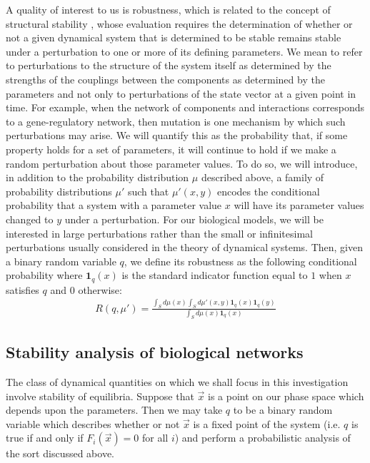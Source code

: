 A quality of interest to us is robustness, which is related to the concept of structural stability \cite{Smale1967}, whose evaluation requires the determination of whether or not a given dynamical system that is determined to be stable remains stable under a perturbation to one or more of its defining parameters. We mean to refer to perturbations to the structure of the system itself as determined by the strengths of the couplings between the components as determined by the parameters and not only to perturbations of the state vector at a given point in time. For example, when the network of components and interactions corresponds to a gene-regulatory network, then mutation is one mechanism by which such perturbations may arise.  We will quantify this as the probability that, if some property holds for a set of parameters, it will continue to hold if we make a random perturbation about those parameter values. To do so, we will introduce, in addition to the probability distribution $\mu$ described above, a family of probability distributions $\mu'$ such that $\mu'(x,y)$ encodes the conditional probability that a system with a parameter value $x$ will have its parameter values changed to $y$ under a perturbation.  For our biological models, we will be interested in large perturbations rather than the small or infinitesimal perturbations usually considered in the theory of dynamical systems.  Then, given a binary random variable $q$, we define its robustness as the following conditional probability where $\mathbf{1}_q(x)$ is the standard indicator function equal to $1$ when $x$ satisfies $q$ and $0$ otherwise:
\begin{align}\label{eq:robustness}
  R (q,\mu') =
  \frac{\int_S d\mu(x) \int_S d\mu'(x,y) \mathbf{1}_q(x) \mathbf{1}_q(y)}
  {\int_S d\mu(x) \mathbf{1}_q(x)}
\end{align}

\subsection{Stability analysis of biological networks}
The class of dynamical quantities on which we shall focus in this
investigation involve stability of equilibria.  Suppose that $\vec x$
is a point on our phase space which depends upon the parameters.  Then
we may take $q$ to be a binary random variable which describes whether
or not $\vec x$ is a fixed point of the system (i.e. $q$ is true if and only if
$F_i(\vec{x})=0$ for all $i$) and perform a probabilistic analysis
of the sort discussed above.

